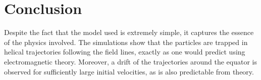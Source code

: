 \section{Conclusion}

Despite the fact that the model used is extremely simple, it captures the essence of the physics involved. The simulations show that the particles are trapped in helical trajectories following the field lines, exactly as one would predict using electromagnetic theory. Moreover, a drift of the trajectories around the equator is observed for sufficiently large initial velocities, as is also predictable from theory. 
